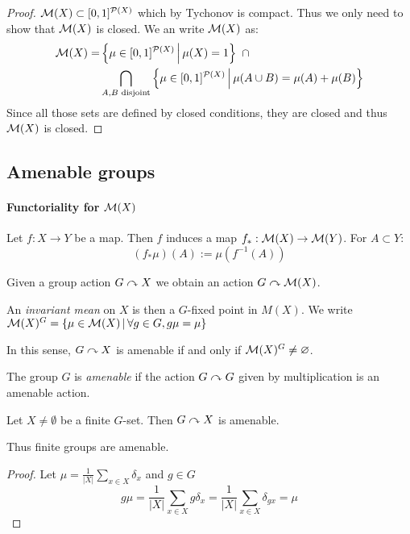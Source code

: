     \begin{proof}
        $\mathcal{M}(X) \subset [0, 1]^{\mathcal{P}(X)}$ which by Tychonov is compact.
        Thus we only need to show that $\mathcal{M}(X)$ is closed.
        We an write $\mathcal{M}(X)$ as:
        \begin{align*}
            \mathcal{M}(X) =&
            \left\{ 
                \mu \in [0, 1]^{\mathcal{P}(X)}
             \, \middle| \, 
                \mu(X) = 1
             \right\}
            ~\cap \\&
            \bigcap_{A, B \text{ disjoint}}
            \left\{ 
                \mu \in [0, 1]^{\mathcal{P}(X)}
             \, \middle| \, 
                \mu(A \cup B) = \mu(A) + \mu(B)
             \right\}
        \end{align*}
        Since all those sets are defined by closed conditions, 
        they are closed and thus $\mathcal{M}(X)$ is closed.
    \end{proof}

    \subsection{Amenable groups}
    \paragraph{Functoriality for $\mathcal{M}(X)$}

    Let $f: X \to Y$ be a map. 
    Then $f$ induces a map $f_* : \mathcal{M}(X) \to \mathcal{M}(Y)$.
    For $A \subset Y$:
     \[
        (f_* \mu)(A) := \mu(f^{-1}(A))
    \]

    Given a group action $G \curvearrowright X$ we obtain an action $G \curvearrowright \mathcal{M}(X)$.  

    \begin{definition}
        An \emph{invariant mean} on $X$ is then a $G$-fixed point 
        in $M(X)$.
        We write $\mathcal{M}(X)^G = \left\{ \mu \in \mathcal{M}(X) \, \middle| \,  \forall g \in G, g\mu = \mu \right\}$ 
    \end{definition}

    In this sense, $G \curvearrowright X$ is amenable if and only if
    $\mathcal{M}(X)^G \neq \varnothing$.

    \begin{definition}
        The group $G$ is \emph{amenable} 
        if the action $G \curvearrowright G$ given by multiplication
        is an amenable action.
    \end{definition}

    \begin{example}
        Let $X \neq \emptyset$ be a finite $G$-set.
        Then $G \curvearrowright X$ is amenable.

        Thus finite groups are amenable.
    \end{example}
    \begin{proof}
        Let $\mu = \frac{1}{|X|} \sum_{x \in X} \delta_x$ and $g \in G$
        \[
            g\mu = \frac{1}{|X|} \sum_{x \in X} g\delta_x
            = \frac{1}{|X|} \sum_{x \in X} \delta_{gx}
            = \mu
        \]
    \end{proof}

